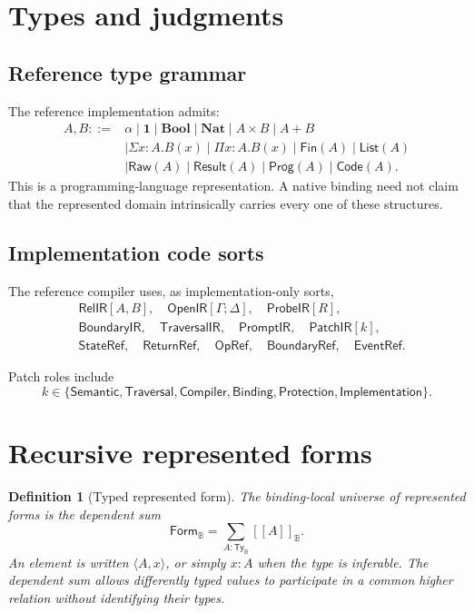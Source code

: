 \documentclass[11pt,oneside]{article}
\newtheorem{definition}{Definition}[section]
\newcommand{\B}{\mathbb B}
\newcommand{\Prog}{\mathsf{Prog}}
\newcommand{\Raw}{\mathsf{Raw}}
\newcommand{\Result}{\mathsf{Result}}
\newcommand{\OpenIR}{\mathsf{OpenIR}}
\newcommand{\RelIR}{\mathsf{RelIR}}
\newcommand{\ProbeIR}{\mathsf{ProbeIR}}
\newcommand{\BoundaryIR}{\mathsf{BoundaryIR}}
\newcommand{\TraversalIR}{\mathsf{TraversalIR}}
\newcommand{\PromptIR}{\mathsf{PromptIR}}
\newcommand{\PatchIR}{\mathsf{PatchIR}}
\newcommand{\StateRef}{\mathsf{StateRef}}
\newcommand{\ReturnRef}{\mathsf{ReturnRef}}
\newcommand{\OpRef}{\mathsf{OpRef}}
\newcommand{\BoundaryRef}{\mathsf{BoundaryRef}}
\newcommand{\EventRef}{\mathsf{EventRef}}
\newcommand{\den}[1]{[\![#1]\!]}
\begin{document}
\section{Types and judgments}

\subsection{Reference type grammar}

The reference implementation admits:
\[
\begin{aligned}
A,B ::= {}&
\alpha
\mid \mathbf 1
\mid \mathbf{Bool}
\mid \mathbf{Nat}
\mid A\times B
\mid A+B\\
&\mid \Sigma x:A.B(x)
\mid \Pi x:A.B(x)
\mid \mathsf{Fin}(A)
\mid \mathsf{List}(A)\\
&\mid \Raw(A)
\mid \Result(A)
\mid \Prog(A)
\mid \mathsf{Code}(A).
\end{aligned}
\]
This is a programming-language representation.  A native binding need not claim that the represented domain intrinsically carries every one of these structures.

\subsection{Implementation code sorts}

The reference compiler uses, as implementation-only sorts,
\[
\begin{aligned}
&\RelIR[A,B],\quad
\OpenIR[\Gamma;\Delta],\quad
\ProbeIR[R],\\
&\BoundaryIR,\quad
\TraversalIR,\quad
\PromptIR,\quad
\PatchIR[k],\\
&\StateRef,\quad
\ReturnRef,\quad
\OpRef,\quad
\BoundaryRef,\quad
\EventRef.
\end{aligned}
\]

Patch roles include
\[
k\in
\{
\mathsf{Semantic},
\mathsf{Traversal},
\mathsf{Compiler},
\mathsf{Binding},
\mathsf{Protection},
\mathsf{Implementation}
\}.
\]


\section{Recursive represented forms}

\begin{definition}[Typed represented form]
The binding-local universe of represented forms is the dependent sum
\[
\boxed{
\mathsf{Form}_{\B}
=
\sum_{A:\mathsf{Ty}_{\B}}\den{A}_{\B}.
}
\]
An element is written \(\langle A,x\rangle\), or simply \(x:A\) when the type is inferable.  The dependent sum allows differently typed values to participate in a common higher relation without identifying their types.
\end{definition}
\end{document}
